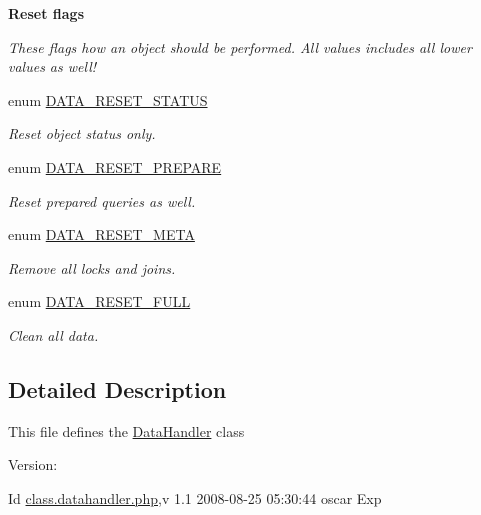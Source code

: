 \begin{Indent}{\bf Reset flags}\par
{\em These flags how an object should be performed. All values includes all lower values as well! }\begin{CompactItemize}
\item 
enum \hyperlink{class_8datahandler_8php_9266811d651cb3ff8c5fdf00111e677b}{DATA\_\-RESET\_\-STATUS} 
\begin{CompactList}\small\item\em Reset object status only. \item\end{CompactList}\item 
enum \hyperlink{class_8datahandler_8php_19a99423705b41e563424ae76d7fe184}{DATA\_\-RESET\_\-PREPARE} 
\begin{CompactList}\small\item\em Reset prepared queries as well. \item\end{CompactList}\item 
enum \hyperlink{class_8datahandler_8php_3ce9f928f9ba75096925bd4157246bbb}{DATA\_\-RESET\_\-META} 
\begin{CompactList}\small\item\em Remove all locks and joins. \item\end{CompactList}\item 
enum \hyperlink{class_8datahandler_8php_2a28429433990da242faa223d5a49f0a}{DATA\_\-RESET\_\-FULL} 
\begin{CompactList}\small\item\em Clean all data. \item\end{CompactList}\end{CompactItemize}
\end{Indent}


\subsection{Detailed Description}
This file defines the \hyperlink{classDataHandler}{DataHandler} class \begin{Desc}
\item[Version:]\end{Desc}
\begin{Desc}
\item[Id]\hyperlink{class_8datahandler_8php}{class.datahandler.php},v 1.1 2008-08-25 05:30:44 oscar Exp \end{Desc}


